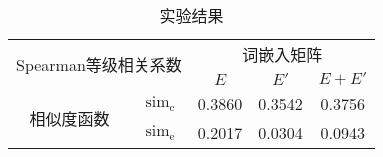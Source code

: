 \begin{table}[h]
	\caption{实验结果}
	\label{t:embedding result}
	\vspace{0.5em}\centering\wuhao
	\begin{tabular}{ccccc}
		\toprule[1.5pt]
		\multicolumn{2}{c}{\multirow{2}{*}{Spearman等级相关系数}} & \multicolumn{3}{c}{词嵌入矩阵} \\
		& & $E$ & $E'$ & $E + E'$ \\
		\midrule[1pt]
		\multirow{2}{*}{相似度函数} & $\text{sim}_\text{c}$ & 0.3860 & 0.3542 & 0.3756 \\
		& $\text{sim}_\text{e}$ & 0.2017 & 0.0304 & 0.0943 \\
		\bottomrule[1.5pt]
	\end{tabular}
\end{table}